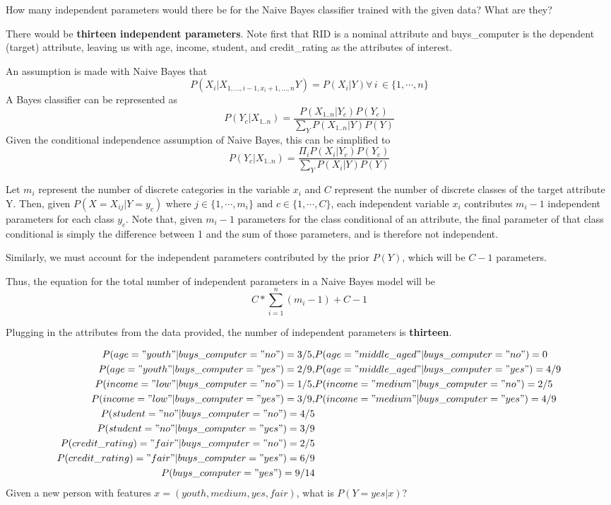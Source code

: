 \documentclass[11pt,largemargins]{homework}
\begin{document}
\question
\begin{alphaparts}
	\questionpart How many independent parameters would there be for the Naive Bayes classifier trained with the given data? What are they?

	There would be \textbf{thirteen independent parameters}. Note first that RID is a nominal attribute and buys\_computer is the dependent (target) attribute, leaving us with age, income, student, and credit\_rating as the attributes of interest.

	An assumption is made with Naive Bayes that $$P(X_i|X_{1,\ldots,i-1, x_i+1, \ldots, n}Y)=P(X_i|Y)\forall\, i\,\in\{1, \cdots, n\}$$ 
	A Bayes classifier can be represented as
	$$P(Y_c|X_{1..n})=\frac{P(X_{1..n}|Y_c)P(Y_c)}{\sum_YP(X_{1..n}|Y)P(Y)}$$
	Given the conditional independence assumption of Naive Bayes, this can be simplified to
	$$P(Y_c|X_{1..n})=\frac{\Pi_iP(X_i|Y_c)P(Y_c)}{\sum_YP(X_i|Y)P(Y)}$$

	Let $m_i$ represent the number of discrete categories in the variable $x_i$ and $C$ represent the number of discrete classes of the target attribute Y. Then, given $P(X=X_{ij}|Y=y_c)$ where $j\in \{1, \cdots,m_i\}\text{ and }c\in\{1,\cdots,C\}$, each independent variable $x_i$ contributes $m_i-1$ independent parameters for each class $y_c$. Note that, given $m_i-1$ parameters for the class conditional of an attribute, the final parameter of that class conditional is simply the difference between 1 and the sum of those parameters, and is therefore not independent.
	
	Similarly, we must account for the independent parameters contributed by the prior $P(Y)$, which will be $C-1$ parameters.

	Thus, the equation for the total number of independent parameters in a Naive Bayes model will be
	$$C*\sum_{i=1}^n(m_i-1)+C-1$$

	Plugging in the attributes from the data provided, the number of independent parameters is \textbf{thirteen}.

	\questionpart
	{
		\tiny
		\begin{align*}
			P(age="youth"|buys\_computer="no")=3/5, &P(age="middle\_aged"|buys\_computer="no")=0\\
			P(age="youth"|buys\_computer="yes")=2/9, &P(age="middle\_aged"|buys\_computer="yes")=4/9\\
			P(income="low"|buys\_computer="no")=1/5, &P(income="medium"|buys\_computer="no")=2/5\\
			P(income="low"|buys\_computer="yes")=3/9, &P(income="medium"|buys\_computer="yes")=4/9\\
			P(student="no"|buys\_computer="no")=4/5\\
			P(student="no"|buys\_computer="yes")=3/9\\
			P(credit\_rating)="fair"|buys\_computer="no")=2/5\\
			P(credit\_rating)="fair"|buys\_computer="yes")=6/9\\
			P(buys\_computer="yes")=9/14
		\end{align*}
	}
	\questionpart Given a new person with features $x=(youth, medium, yes, fair)$, what is $P(Y=yes|x)$?


\end{alphaparts}
\end{document}
